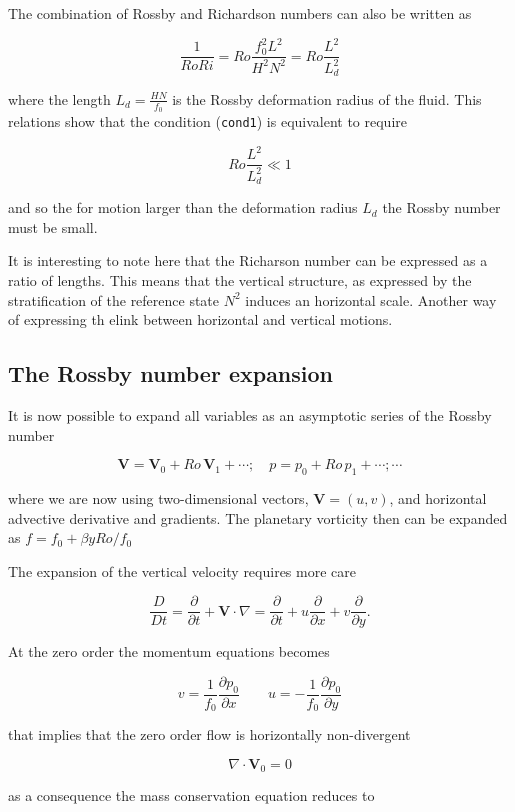 The combination of Rossby and Richardson numbers can also be written as

\[\frac{1}{Ro Ri} = Ro \frac{f_0^2L^2}{H^2N^2} = Ro\frac{L^2}{L_d^2}\]

where the length \(L_d = \frac{HN}{f_0}\) is the Rossby deformation
radius of the fluid. This relations show that the condition
(\texttt{cond1}) is equivalent to require

\[Ro\frac{L^2}{L_d^2} \ll 1\]

and so the for motion larger than the deformation radius \(L_d\) the
Rossby number must be small.

It is interesting to note here that the Richarson number can be
expressed as a ratio of lengths. This means that the vertical structure,
as expressed by the stratification of the reference state \(N^2\)
induces an horizontal scale. Another way of expressing th elink between
horizontal and vertical motions.

\subsection{The Rossby number
expansion}\label{the-rossby-number-expansion}

It is now possible to expand all variables as an asymptotic series of
the Rossby number

\[\mathbf{V}= \mathbf{V}_0 + Ro\,\mathbf{V}_1 + \cdots; \quad p=p_0 + Ro \, p_1 + \cdots ; \cdots\]

where we are now using two-dimensional vectors, \(\mathbf{V}= (u,v)\),
and horizontal advective derivative and gradients. The planetary
vorticity then can be expanded as \(f = f_0 + \beta y Ro/f_0\)

The expansion of the vertical velocity requires more care

\[\frac{D }{Dt} = \frac{\partial }{\partial t} + \mathbf{V}\cdot\nabla = \frac{\partial }{\partial t} + u\frac{\partial }{\partial x} + v\frac{\partial }{\partial y}.\]

At the zero order the momentum equations becomes

{\[v = \frac{1}{f_0}\frac{\partial p_0}{\partial x} \qquad u = -\frac{1}{f_0}\frac{\partial p_0}{\partial y}\]}

that implies that the zero order flow is horizontally non-divergent

\[\nabla \cdot\mathbf{V}_0 =0\]

as a consequence the mass conservation equation reduces to

